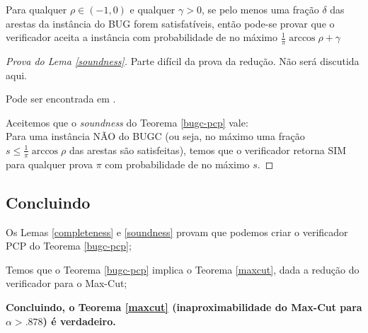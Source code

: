 \documentclass[12pt,a4paper]{article}
\begin{document}
\begin{itemize}
    \begin{lema} \label{soundness}
        Para qualquer $\rho \in (-1, 0)$ e qualquer $\gamma>0$, se pelo menos uma fração $\delta$ das arestas da instância do BUG forem satisfatíveis, então pode-se provar que  o verificador aceita a instância com probabilidade de no máximo $\frac{1}{\pi}\arccos{\rho} + \gamma$
    \end{lema}
    \begin{proof}[Prova do Lema \ref{soundness}]
        \item Parte difícil da prova da redução. Não será discutida aqui.
        \item Pode ser encontrada em \cite{maxcut}.
        \item Aceitemos que o \textit{soundness} do Teorema \ref{bugc-pcp} vale:\\
        Para uma instância NÃO do BUGC (ou seja, no máximo uma fração $s\leq \frac{1}{\pi}\arccos\rho$ das arestas são satisfeitas), temos que o verificador retorna SIM para qualquer prova $\pi$ com probabilidade de no máximo $s$. 
    \end{proof}

\subsection{Concluindo}
    
    \item Os Lemas \ref{completeness} e \ref{soundness} provam que podemos criar o verificador PCP do Teorema \ref{bugc-pcp};
    \item Temos que o Teorema \ref{bugc-pcp} implica o Teorema \ref{maxcut}, dada a redução do verificador para o Max-Cut;
    \item \textbf{Concluindo, o Teorema \ref{maxcut} (inaproximabilidade do Max-Cut para $\alpha > .878$) é verdadeiro.}

\end{itemize}
  
\end{document}
